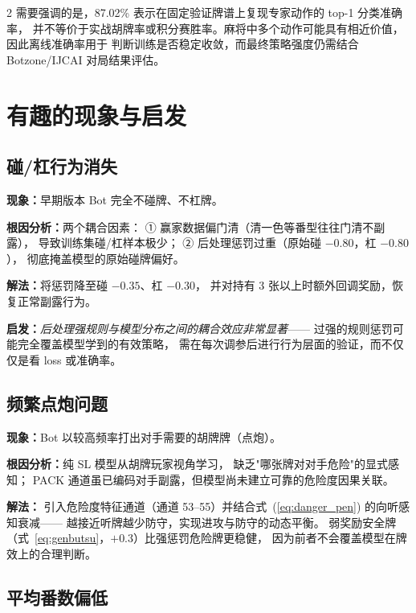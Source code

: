 \documentclass{article}
\begin{document}
\begin{multicols}{2}
需要强调的是，87.02\% 表示在固定验证牌谱上复现专家动作的 top-1 分类准确率，
并不等价于实战胡牌率或积分赛胜率。麻将中多个动作可能具有相近价值，因此离线准确率用于
判断训练是否稳定收敛，而最终策略强度仍需结合 Botzone/IJCAI 对局结果评估。

\section{有趣的现象与启发}
\label{sec:phenomenon}

\subsection{碰/杠行为消失}

\textbf{现象：}早期版本 Bot 完全不碰牌、不杠牌。

\textbf{根因分析：}两个耦合因素：
① 赢家数据偏门清（清一色等番型往往门清不副露），
   导致训练集碰/杠样本极少；
② 后处理惩罚过重（原始碰 $-0.80$，杠 $-0.80$），
   彻底掩盖模型的原始碰牌偏好。

\textbf{解法：}将惩罚降至碰 $-0.35$、杠 $-0.30$，
并对持有 3 张以上时额外回调奖励，恢复正常副露行为。

\textbf{启发：}\textit{后处理强规则与模型分布之间的耦合效应非常显著}——
过强的规则惩罚可能完全覆盖模型学到的有效策略，
需在每次调参后进行行为层面的验证，而不仅仅是看 loss 或准确率。

\subsection{频繁点炮问题}

\textbf{现象：}Bot 以较高频率打出对手需要的胡牌牌（点炮）。

\textbf{根因分析：}纯 SL 模型从胡牌玩家视角学习，
缺乏"哪张牌对对手危险"的显式感知；
PACK 通道虽已编码对手副露，但模型尚未建立可靠的危险度因果关联。

\textbf{解法：}
引入危险度特征通道（通道 53--55）并结合式~(\ref{eq:danger_pen}) 的向听感知衰减——
越接近听牌越少防守，实现进攻与防守的动态平衡。
弱奖励安全牌（式~\ref{eq:genbutsu}，$+0.3$）比强惩罚危险牌更稳健，
因为前者不会覆盖模型在牌效上的合理判断。

\subsection{平均番数偏低}


\end{multicols}
\end{document}
